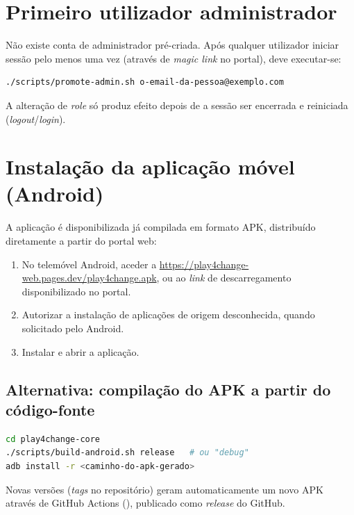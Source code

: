 \documentclass[11pt,a4paper]{article}
\newcommand{\code}[1]{\texttt{\seqsplit{#1}}}
\begin{document}
\section{Primeiro utilizador administrador}

Não existe conta de administrador pré-criada. Após qualquer utilizador iniciar sessão pelo menos uma vez (através de \textit{magic link} no portal), deve executar-se:

\begin{lstlisting}[language=bash]
./scripts/promote-admin.sh o-email-da-pessoa@exemplo.com
\end{lstlisting}

A alteração de \textit{role} só produz efeito depois de a sessão ser encerrada e reiniciada (\textit{logout}/\textit{login}).

\section{Instalação da aplicação móvel (Android)}

A aplicação é disponibilizada já compilada em formato APK, distribuído diretamente a partir do portal web:

\begin{enumerate}
    \item No telemóvel Android, aceder a \url{https://play4change-web.pages.dev/play4change.apk}, ou ao \textit{link} de descarregamento disponibilizado no portal.
    \item Autorizar a instalação de aplicações de origem desconhecida, quando solicitado pelo Android.
    \item Instalar e abrir a aplicação.
\end{enumerate}

\subsection*{Alternativa: compilação do APK a partir do código-fonte}

\begin{lstlisting}[language=bash]
cd play4change-core
./scripts/build-android.sh release   # ou "debug"
adb install -r <caminho-do-apk-gerado>
\end{lstlisting}

Novas versões (\textit{tags} \code{v*} no repositório) geram automaticamente um novo APK através de GitHub Actions (\code{release.yml}), publicado como \textit{release} do GitHub.
\end{document}
